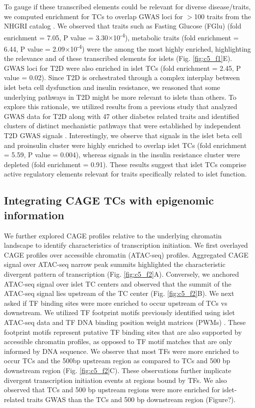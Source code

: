 To gauge if these transcribed elements could be relevant for diverse disease/traits, we computed enrichment for TCs to overlap GWAS loci for $>$100 traits from the NHGRI catalog \cite{bunielloNHGRIEBIGWASCatalog2019}. We observed that traits such as Fasting Glucose (FGlu) (fold enrichment = 7.05, P value = 3.30$\times$10\textsuperscript{-4}), metabolic traits (fold enrichment = 6.44, P value = 2.09$\times$10\textsuperscript{-4}) were the among the most highly enriched, highlighting the relevance and of these transcribed elements for islets (Fig. \ref{fig:c5_f1}E). GWAS loci for T2D were also enriched in islet TCs (fold enrichment = 2.45, P value = 0.02). Since T2D is orchestrated through a complex interplay between islet beta cell dysfunction and insulin resistance, we reasoned that some underlying pathways in T2D might be more relevant to islets than others. To explore this rationale, we utilized results from a previous study that analyzed GWAS data for T2D along with 47 other diabetes related traits and identified clusters of distinct mechanistic pathways that were established by independent T2D GWAS signals \cite{udlerTypeDiabetesGenetic2018}. Interestingly, we observe that signals in the islet beta cell and proinsulin cluster were highly enriched to overlap islet TCs (fold enrichment = 5.59, P value = 0.004), whereas signals in the insulin resistance cluster were depleted (fold enrichment = 0.91). These results suggest that islet TCs comprise active regulatory elements relevant for traits specifically related to islet function.
    
\subsection{Integrating CAGE TCs with epigenomic information}
We further explored CAGE profiles relative to the underlying chromatin landscape to identify characteristics of transcription initiation. We first overlayed CAGE profiles over accessible chromatin (ATAC-seq) profiles. Aggregated CAGE signal over ATAC-seq narrow peak summits highlighted the characteristic divergent pattern of transcription (Fig. \ref{fig:c5_f2}A). Conversely, we anchored ATAC-seq signal over islet TC centers and observed that the summit of the ATAC-seq signal lies upstream of the TC center (Fig. \ref{fig:c5_f2}B). We next asked if TF binding sites were more enriched to occur upstream of TCs vs downstream. We utilized TF footprint motifs previously identified using islet ATAC-seq data and TF DNA binding position weight matrices (PWMs) \cite{varshneyGeneticRegulatorySignatures2017}. These footprint motifs represent putative TF binding sites that are also supported by accessible chromatin profiles, as opposed to TF motif matches that are only informed by DNA sequence. We observe that most TFs were more enriched to occur TCs and the 500bp upstream region as compared to TCs and 500 bp downstream region (Fig. \ref{fig:c5_f2}C). These observations further implicate divergent transcription initiation events at regions bound by TFs. We also observed that TCs and 500 bp upstream regions were more enriched for islet-related traits GWAS than the TCs and 500 bp downstream region (Figure?).


